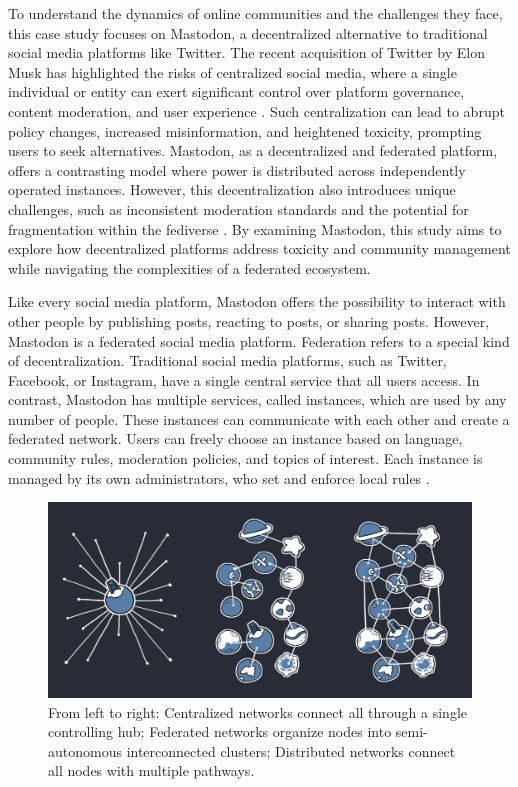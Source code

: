 To understand the dynamics of online communities and the challenges they face, this case study focuses on Mastodon, a decentralized alternative to traditional social media platforms like Twitter. The recent acquisition of Twitter by Elon Musk has highlighted the risks of centralized social media, where a single individual or entity can exert significant control over platform governance, content moderation, and user experience \cite{zia:2023}. Such centralization can lead to abrupt policy changes, increased misinformation, and heightened toxicity, prompting users to seek alternatives. Mastodon, as a decentralized and federated platform, offers a contrasting model where power is distributed across independently operated instances. However, this decentralization also introduces unique challenges, such as inconsistent moderation standards and the potential for fragmentation within the fediverse \cite{zia:2023}. By examining Mastodon, this study aims to explore how decentralized platforms address toxicity and community management while navigating the complexities of a federated ecosystem.

Like every social media platform, Mastodon offers the possibility to interact with other people by publishing posts, reacting to posts, or sharing posts. However, Mastodon is a federated social media platform. Federation refers to a special kind of decentralization. Traditional social media platforms, such as Twitter, Facebook, or Instagram, have a single central service that all users access. In contrast, Mastodon has multiple services, called instances, which are used by any number of people. These instances can communicate with each other and create a federated network. Users can freely choose an instance based on language, community rules, moderation policies, and topics of interest. Each instance is managed by its own administrators, who set and enforce local rules \cite{mastodon:docs}.

\begin{figure}[tb]
    \centering
    \includegraphics[width=\textwidth]{../material/network_models.jpg}
    \caption{From left to right: Centralized networks connect all through a single controlling hub; Federated networks organize nodes into semi-autonomous interconnected clusters; Distributed networks connect all nodes with multiple pathways. \cite{mastodon:docs}}
    \label{fig:network-models}
\end{figure}

